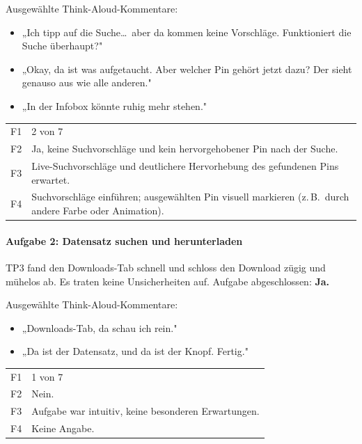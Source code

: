 \documentclass{article}
\begin{document}
Ausgewählte Think-Aloud-Kommentare:
\begin{itemize}
  \item „Ich tipp auf die Suche\ldots\ aber da kommen keine Vorschläge.
        Funktioniert die Suche überhaupt?"
  \item „Okay, da ist was aufgetaucht. Aber welcher Pin gehört jetzt
        dazu? Der sieht genauso aus wie alle anderen."
  \item „In der Infobox könnte ruhig mehr stehen."
\end{itemize}

\begin{tabular}{@{}lp{10cm}@{}}
  F1 & 2 von 7 \\
  F2 & Ja, keine Suchvorschläge und kein hervorgehobener Pin nach der Suche. \\
  F3 & Live-Suchvorschläge und deutlichere Hervorhebung des gefundenen Pins erwartet. \\
  F4 & Suchvorschläge einführen; ausgewählten Pin visuell markieren
       (z.\,B.\ durch andere Farbe oder Animation). \\
\end{tabular}

\paragraph{Aufgabe 2: Datensatz suchen und herunterladen}

TP3 fand den Downloads-Tab schnell und schloss den Download zügig
und mühelos ab. Es traten keine Unsicherheiten auf.
Aufgabe abgeschlossen: \textbf{Ja.}

Ausgewählte Think-Aloud-Kommentare:
\begin{itemize}
  \item „Downloads-Tab, da schau ich rein."
  \item „Da ist der Datensatz, und da ist der Knopf. Fertig."
\end{itemize}

\begin{tabular}{@{}lp{10cm}@{}}
  F1 & 1 von 7 \\
  F2 & Nein. \\
  F3 & Aufgabe war intuitiv, keine besonderen Erwartungen. \\
  F4 & Keine Angabe. \\
\end{tabular}

\end{document}

